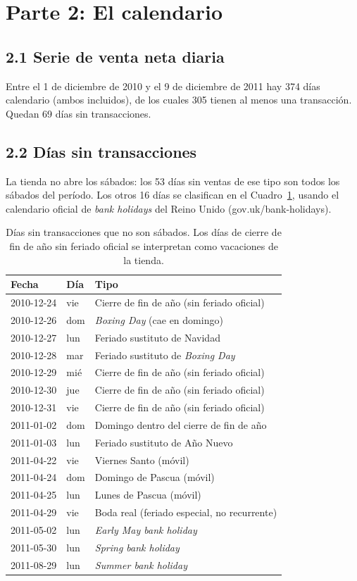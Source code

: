\documentclass[11pt]{article}
\begin{document}
\section*{Parte 2: El calendario}

\subsection*{2.1 Serie de venta neta diaria}
Entre el 1 de diciembre de 2010 y el 9 de diciembre de 2011 hay 374 d\'ias
calendario (ambos incluidos), de los cuales 305 tienen al menos una
transacci\'on. Quedan 69 d\'ias sin transacciones.

\subsection*{2.2 D\'ias sin transacciones}
La tienda no abre los s\'abados: los 53 d\'ias sin ventas de ese tipo son
todos los s\'abados del per\'iodo. Los otros 16 d\'ias se clasifican en el
Cuadro~\ref{tab:sinventas}, usando el calendario oficial de \emph{bank
holidays} del Reino Unido (gov.uk/bank-holidays).

\begin{table}[H]
\centering
\small
\begin{tabular}{l|l|l}
\hline
Fecha & D\'ia & Tipo \\
\hline
2010-12-24 & vie & Cierre de fin de a\~no (sin feriado oficial) \\
2010-12-26 & dom & \emph{Boxing Day} (cae en domingo) \\
2010-12-27 & lun & Feriado sustituto de Navidad \\
2010-12-28 & mar & Feriado sustituto de \emph{Boxing Day} \\
2010-12-29 & mi\'e & Cierre de fin de a\~no (sin feriado oficial) \\
2010-12-30 & jue & Cierre de fin de a\~no (sin feriado oficial) \\
2010-12-31 & vie & Cierre de fin de a\~no (sin feriado oficial) \\
2011-01-02 & dom & Domingo dentro del cierre de fin de a\~no \\
2011-01-03 & lun & Feriado sustituto de A\~no Nuevo \\
2011-04-22 & vie & Viernes Santo (m\'ovil) \\
2011-04-24 & dom & Domingo de Pascua (m\'ovil) \\
2011-04-25 & lun & Lunes de Pascua (m\'ovil) \\
2011-04-29 & vie & Boda real (feriado especial, no recurrente) \\
2011-05-02 & lun & \emph{Early May bank holiday} \\
2011-05-30 & lun & \emph{Spring bank holiday} \\
2011-08-29 & lun & \emph{Summer bank holiday} \\
\hline
\end{tabular}
\caption{D\'ias sin transacciones que no son s\'abados. Los d\'ias de cierre
de fin de a\~no sin feriado oficial se interpretan como vacaciones de la
tienda.}
\label{tab:sinventas}
\end{table}
\end{document}

